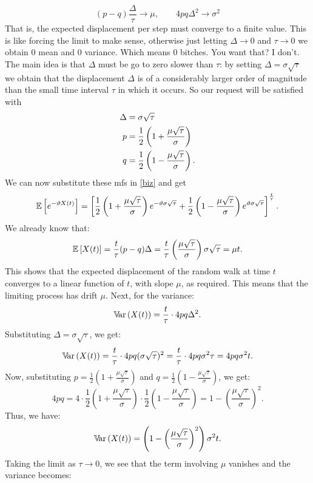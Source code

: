 \documentclass[12pt]{report}
\begin{document}
\begin{equation*}
	(p-q)\frac{\Delta}{\tau}\to\mu,\qquad4pq\Delta^{2}\to\sigma^{2}
\end{equation*}
That is, the expected displacement per step must converge to a finite value. This is like forcing the limit to make sense, otherwise just letting $\Delta\to0$ and $\tau\to0$ we obtain 0 mean and 0 variance. Which means 0 bitches. You want that? I don't. The main idea is that $\Delta$ must be go to zero slower than $\tau$: by setting $\Delta=\sigma\sqrt{\tau}$ we obtain that the displacement $\Delta$ is of a considerably larger order of magnitude than the small time interval $\tau$ in which it occurs. So our request will be satisfied with
\begin{align*}
	\Delta&=\sigma\sqrt{\tau}\\
	p&=\frac{1}{2}\left(1+\frac{\mu\sqrt{\tau}}{\sigma}\right)\\
	q&=\frac{1}{2}\left(1-\frac{\mu\sqrt{\tau}}{\sigma}\right).
\end{align*}
We can now substitute these mfs in \ref{biz} and get
\begin{equation*}
	\mathbb{E}\left[e^{-\vartheta X(t)}\right]=\left[\frac{1}{2}\left(1+\frac{\mu\sqrt{\tau}}{\sigma}\right)e^{-\vartheta\sigma\sqrt{\tau}}+\frac{1}{2}\left(1-\frac{\mu\sqrt{\tau}}{\sigma}\right)e^{\vartheta\sigma\sqrt{\tau}}\right]^{\frac{t}{\tau}}.
\end{equation*}
We already know that:
\[
\mathbb{E}\left[X(t)\right] = \frac{t}{\tau} (p - q) \Delta = \frac{t}{\tau} \left( \frac{\mu \sqrt{\tau}}{\sigma} \right) \sigma \sqrt{\tau} = \mu t.
\]
This shows that the expected displacement of the random walk at time \(t\) converges to a linear function of \(t\), with slope \(\mu\), as required. This means that the limiting process has drift \(\mu\).
Next, for the variance:
\[
\mathbb{V}\!\mathrm{ar}\,(X(t)) = \frac{t}{\tau} \cdot 4pq \Delta^2.
\]
Substituting \(\Delta = \sigma \sqrt{\tau}\), we get:
\[
\mathbb{V}\!\mathrm{ar}\,(X(t)) = \frac{t}{\tau} \cdot 4pq (\sigma \sqrt{\tau})^2 = \frac{t}{\tau} \cdot 4pq \sigma^2 \tau = 4pq \sigma^2 t.
\]
Now, substituting \(p = \frac{1}{2} \left( 1 + \frac{\mu \sqrt{\tau}}{\sigma} \right)\) and \(q = \frac{1}{2} \left( 1 - \frac{\mu \sqrt{\tau}}{\sigma} \right)\), we get:
\[
4pq = 4 \cdot \frac{1}{2} \left( 1 + \frac{\mu \sqrt{\tau}}{\sigma} \right) \cdot \frac{1}{2} \left( 1 - \frac{\mu \sqrt{\tau}}{\sigma} \right) = 1 - \left( \frac{\mu \sqrt{\tau}}{\sigma} \right)^2.
\]
Thus, we have:
\[
\mathbb{V}\!\mathrm{ar}\,(X(t)) = \left( 1 - \left( \frac{\mu \sqrt{\tau}}{\sigma} \right)^2 \right) \sigma^2 t.
\]
Taking the limit as \(\tau \to 0\), we see that the term involving \(\mu\) vanishes and the variance becomes:
\end{document}
